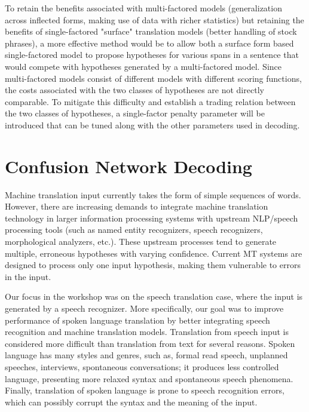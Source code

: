 \documentclass[11pt]{report}
\theoremstyle{plain}
\begin{document}
To retain the benefits associated with multi-factored models
(generalization across inflected forms, making use of data with
richer statistics) but retaining the benefits of single-factored
"surface" translation models (better handling of stock phrases), a
more effective method would be to allow both a surface form based
single-factored model to propose hypotheses for various spans in a
sentence that would compete with hypotheses generated by a
multi-factored model.  Since multi-factored models consist of
different models with different scoring functions, the costs
associated with the two classes of hypotheses are not directly
comparable.  To mitigate this difficulty and establish a trading
relation between the two classes of hypotheses, a single-factor
penalty parameter will be introduced that can be tuned along with
the other parameters used in decoding.


\chapter{Confusion Network Decoding}\label{chap:confusion-networks}

\def\x{{\mathbf x}}
\def\L{{\cal L}}
\newcommand{\devfour}{{\tt dev4}}
\newcommand{\eval}{{\tt eval}}
\newcommand{\E}{{\bf e}}
\newcommand{\F}{{\bf f}}
\newcommand{\bm}[1]{{\mbox{\boldmath${#1}$}}}
\newcommand{\tf}{\tilde{f}}
\newcommand{\te}{\tilde{e}}
\newcommand{\teb}{{\bf \te}}


Machine translation input currently takes the form of simple sequences of words. 
However, there are increasing demands to integrate machine translation technology 
in larger information processing systems with upstream NLP/speech processing tools 
(such as named entity  recognizers, speech recognizers, morphological analyzers, etc.). 
These upstream processes tend to generate multiple, erroneous hypotheses with 
varying confidence.  Current MT systems are designed to process only one input 
hypothesis, making them vulnerable to errors in the input.  

\noindent
Our  focus in the workshop was on the speech translation case, where the input is 
generated by a speech recognizer.  More specifically, our goal was  to improve performance 
of spoken language translation by better integrating  speech recognition and 
machine translation  models. Translation from speech input is considered  more difficult than 
translation from text for several reasons. Spoken language has many  styles and 
genres, such as, formal read speech, unplanned speeches, interviews, spontaneous 
conversations;  it produces less controlled language, presenting more relaxed syntax 
and spontaneous speech phenomena. Finally, translation of spoken language is prone 
to speech recognition  errors, which can  possibly corrupt the  syntax and the meaning of 
the input.
\end{document}
